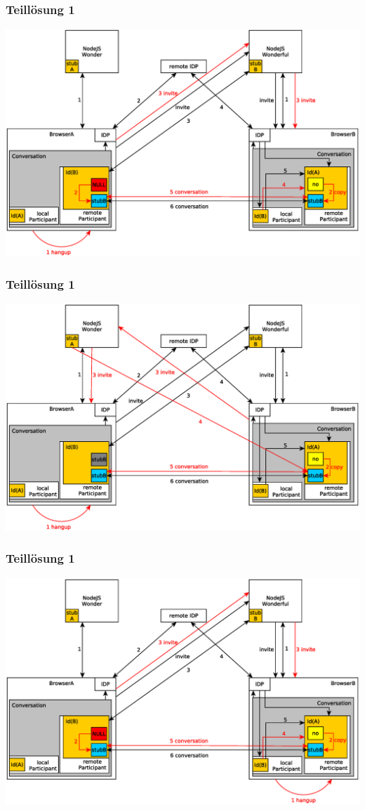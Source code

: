 \documentclass{beamer}
\begin{document}
\begin{frame}
	\frametitle{Teillösung 1}
	\includegraphics[scale=0.365,centered]{pictures/close_bye_ah_ab}
\end{frame}
\begin{frame}
	\frametitle{Teillösung 1}
	\includegraphics[scale=0.365,centered]{pictures/close_bye_ah_ba}
\end{frame}
\begin{frame}
	\frametitle{Teillösung 1}
	\includegraphics[scale=0.365,centered]{pictures/close_bye_bh_ab}
\end{frame}
\end{document}
